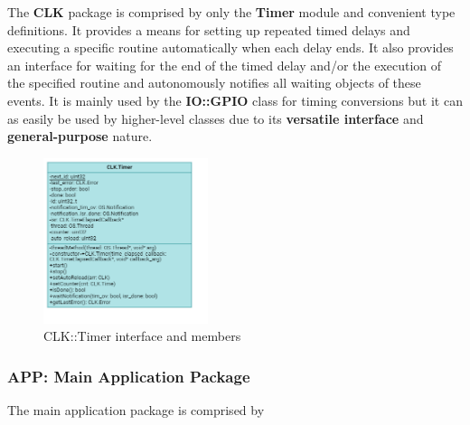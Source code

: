 The \textbf{CLK} package is comprised by only the \textbf{Timer} module and convenient type definitions. It provides a means for setting up repeated timed delays and executing a specific routine automatically when each delay ends. It also provides an interface for waiting for the end of the timed delay and/or the execution of the specified routine and autonomously notifies all waiting objects of these events.
It is mainly used by the \textbf{IO::GPIO} class for timing conversions but it can as easily be used by higher-level classes due to its \textbf{versatile interface} and \textbf{general-purpose} nature.

\begin{figure}[H]
	\centering
	\includegraphics[width=0.43\textwidth]{./img/navig-class-timer.png}
	\caption {CLK::Timer interface and members}
	\label{fig:navig-class-timer}
	\end{figure}




\subsubsection{APP: Main Application Package}

The main application package is comprised by  

